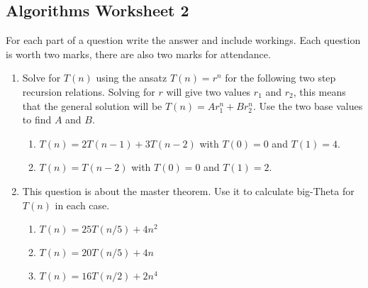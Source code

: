 \documentclass[11pt,a4paper]{scrartcl}
\newif\ifanswers
\begin{document}
\subsection*{Algorithms Worksheet 2}

For each part of a question write the answer and include
workings. Each question is worth two marks, there are also two marks
for attendance.

\begin{enumerate}


\item Solve for $T(n)$ using the ansatz $T(n)=r^n$ for the following
  two step recursion relations. Solving for $r$ will give two values
  $r_1$ and $r_2$, this means that the general solution will be
  $T(n)=Ar_1^n+Br_2^n$. Use the two base values to find $A$ and $B$. 

\begin{enumerate}
\item $T(n)=2T(n-1)+3T(n-2)$ with $T(0)=0$ and $T(1)=4$.
\item $T(n)=T(n-2)$ with $T(0)=0$ and $T(1)=2$.
\end{enumerate}


\ifanswers 

\noindent Solution:

For (a) we have 
\begin{equation}
r^2=2r+3
\end{equation}
so $r^2-2r-3=0$ or $(r-3)(r+1)=0$ so
\begin{equation}
T(n)=3^nA+(-1)^nB
\end{equation}
and the initial conditions give $A+B=0$ and $3A-B=4$ so 
\begin{equation}
T(n)=3^n-(-1)^n
\end{equation}
For (b) we get $r^2=1$ so 
\begin{equation}
T(n)=A+(-1)^nB
\end{equation}
and the initial conditions give $A+B=0$ and $A-B=2$ so
\begin{equation}
T(n)=1-(-1)^n
\end{equation}
\fi

\item This question is about the master theorem. Use it to
  calculate big-Theta for $T(n)$ in each case. 

\begin{enumerate}
\item $T(n)= 25T(n/5)+4n^2$
\item $T(n)= 20T(n/5)+4n$
\item $T(n)= 16T(n/2)+2n^4$
\end{enumerate}


\end{enumerate}
\end{document}

